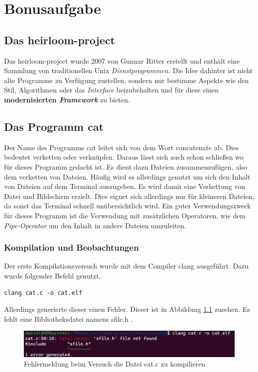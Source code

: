 \chapter{Bonusaufgabe}
\section{Das heirloom-project}
Das heirloom-project wurde 2007 von Gunnar Ritter erstellt und enthält eine Sammlung von traditionellen Unix \textit{Dienstprogrammen}.
Die Idee dahinter ist nicht alte Programme zu Verfügung zustellen, sondern nur bestimme Aspekte wie den Stil, Algorithmen oder das \textit{Interface} beizubehalten und für diese einen \textbf{modernisierten \textit{Framework}} zu bieten\cite{heirloom:2007}.

\section{Das Programm cat}
Der Name des Programms cat leitet sich von dem Wort concatenate ab.
Dies bedeutet verketten oder verknüpfen.
Daraus lässt sich auch schon schließen wo für dieses Programm gedacht ist. Es dient dazu Dateien zusammenzufügen, also dem verketten von Dateien.
Häufig wird es allerdings genutzt um sich den Inhalt von Dateien auf dem Terminal auszugeben.
Es wird damit eine Verkettung von Datei und Bildschirm erzielt.
Dies eignet sich allerdings nur für kleineren Dateien, da sonst das Terminal schnell unübersichtlich wird.
Ein guter Verwendungszweck für dieses Programm ist die Verwendung mit zusätzlichen Operatoren, wie dem \textit{Pipe-Operator} um den Inhalt in andere Dateien umzuleiten\cite{cat:2022}.

\subsection{Kompilation und Beobachtungen}
Der erste Kompilationsversuch wurde mit dem Compiler clang ausgeführt.
Dazu wurde folgender Befehl genutzt.

\begin{lstlisting}
clang cat.c -o cat.elf
\end{lstlisting}

Allerdings generierte dieser einen Fehler.
Dieser ist in Abbildung \ref{clang_cat.c_fehler} zusehen. Es fehlt eine Bibliotheksdatei namens sfile.h .

\begin{figure}[h]
	\centering
	\includegraphics[scale=0.5]{Images/1_clang_cat.c.png}
	\caption{Fehlermeldung beim Versuch die Datei cat.c zu kompilieren}
	\label{clang_cat.c_fehler}
\end{figure}

